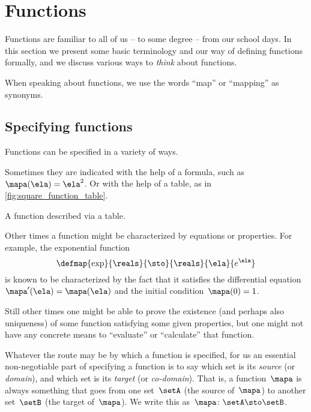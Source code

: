 
\section{Functions}
\label{sec:functions}

Functions are familiar to all of us -- to some degree -- from our school days.
In this section we present some basic terminology and our way of defining functions formally, and we discuss various ways to \emph{think} about functions.

When speaking about functions, we use the words ``map'' or ``mapping'' as synonyms.

\subsection{Specifying functions}
\label{sec:domain-codomain}

Functions can be specified in a variety of ways.

Sometimes they are indicated with the help of a formula, such as~$\mapa(\ela)=\ela^2$.
Or with the help of a table, as in \cref{fig:square_function_table}.

\begin{marginfigure}
    \centering
    \caption{A function described via a table.}
    \label{fig:square_function_table}
\end{marginfigure}

Other times a function might be characterized by equations or properties.
For example, the exponential function
\begin{equation}
    \defmap{\exp}
    {\reals}
    {\sto}
    {\reals}
    {\ela}
    {e^\ela}
\end{equation}
is known to be characterized by the fact that it satisfies the differential equation~$\mapa'(\ela) = \mapa(\ela)$ and the initial condition~$\mapa(0) =1$.

Still other times one might be able to prove the existence (and perhaps also uniqueness) of some function satisfying some given properties, but one might not have any concrete means to ``evaluate'' or ``calculate'' that function.

Whatever the route may be by which a function is specified, for us an essential non-negotiable part of specifying a function is to say which set is its \emph{source} (or \emph{domain}), and which set is its \emph{target} (or \emph{co-domain}).
That is, a function~$\mapa$ is always something that goes from one set~$\setA$ (the source of~$\mapa$) to another set~$\setB$ (the target of~$\mapa$).
We write this as~$\mapa\colon \setA \sto \setB$.

